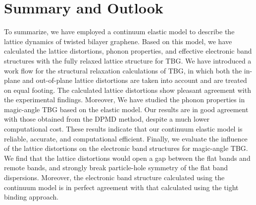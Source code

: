 \documentclass[aps,prx,10pt,twocolumn,superscriptaddress]{revtex4}
\begin{document}
\section{Summary and Outlook}

To summarize, we have employed a continuum elastic model to describe the lattice dynamics of twisted bilayer graphene. Based on this model, we have  calculated the lattice distortions,  phonon properties, and  effective electronic band structures with the fully relaxed lattice structure for TBG. 
We have introduced a  work flow for the structural relaxation calculations of TBG, in which both the in-plane and out-of-plane lattice distortions are taken into account and are treated on equal footing. The calculated lattice distortions show pleasant agreement with the experimental findings. Moreover, We have studied the phonon properties in magic-angle TBG based on the elastic model. Our results are in good agreement with those obtained from the DPMD method, despite  a much lower computational cost. %
These results indicate that our continuum elastic model is reliable, accurate, and computational efficient.  
Finally, we evaluate the influence of the lattice distortions on the electronic band structures for magic-angle TBG. We find that the lattice distortions would  open a gap between the flat bands and remote bands, and strongly break particle-hole symmetry of the flat band dispersions. Moreover, the electronic band structure calculated using the continuum model is in perfect agreement with that calculated using the tight binding approach.
\end{document}
